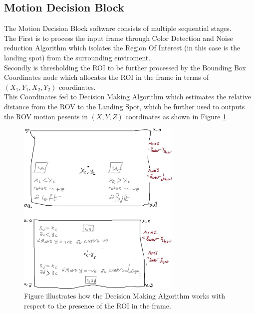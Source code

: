 \documentclass{article}
\begin{document}
  
\subsection{Motion Decision Block}
The Motion Decision Block software consists of multiple sequential stages.\\
The First is to process the input frame through Color Detection and Noise reduction Algorithm which isolates the Region Of Interest (in this case is the landing spot) from the surrounding enviroment.\\
Secondly is thresholding the ROI to be further processed by the Bounding Box Coordinates node which allocates the ROI in the frame in terms of $(X_1,Y_1,X_2,Y_2)$ coordinates.\\
This Coordinates fed to Decision Making Algorithm which estimates the relative distance from the ROV to the Landing Spot, which be further used to outputs the ROV motion pesents in $(X,Y,Z)$ coordinates as shown in Figure \ref{fig:decision}
\begin{figure}[htbp]
    \centering
    \includegraphics[width=0.7\textwidth]{images/motion.jpg}
    \caption{Figure illustrates how the Decision Making Algorithm works with respect to the presence of the ROI in the frame.}
    \label{fig:decision}
\end{figure}
\end{document}
